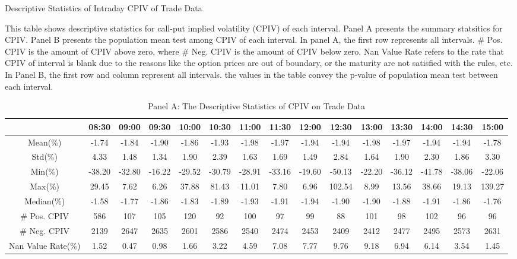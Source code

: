 \begin{table}[h]

\caption{Descriptive Statistics of Intraday CPIV of Trade Data}\label{table:stats_of_CPIV_2}
\begin{threeparttable}

\medskip

{\scriptsize 
This table shows descriptive statistics for call-put implied volatility (CPIV) of each interval. Panel A presents the summary statsitics for CPIV. Panel B presents the population mean test among CPIV of each interval. In panel A, the first row represents all intervals.  \# Pos. CPIV is the amount of CPIV above zero, where \# Neg. CPIV is the amount of CPIV below zero. Nan Value Rate refers to the rate that CPIV of interval is blank due to the reasons like the option prices are out of boundary, or the maturity are not satisfied with the rules, etc. In Panel B, the first row and column represent all intervals. the values in the table convey the p-value of population mean test between each interval.
}
\medskip

\begin{subtable}[t]{\linewidth}

\caption{Panel A: The Descriptive Statistics of CPIV on Trade Data }
\tiny

\begin{tabular}{ccccccccccccccc}
\toprule

                   & 08:30  & 09:00  & 09:30  & 10:00  & 10:30  & 11:00  & 11:30  & 12:00  & 12:30  & 13:00  & 13:30  & 14:00  & 14:30  & 15:00  \\ \midrule	
Mean(\%)           & -1.74  & -1.84  & -1.90  & -1.86  & -1.93  & -1.98  & -1.97  & -1.94  & -1.94  & -1.98  & -1.97  & -1.94  & -1.94  & -1.78  \\
Std(\%)            & 4.33   & 1.48   & 1.34   & 1.90   & 2.39   & 1.63   & 1.69   & 1.49   & 2.84   & 1.64   & 1.90   & 2.30   & 1.86   & 3.30   \\
Min(\%)            & -38.20 & -32.80 & -16.22 & -29.52 & -30.79 & -28.91 & -33.16 & -19.60 & -50.13 & -22.20 & -36.12 & -41.78 & -38.06 & -22.06 \\
Max(\%)            & 29.45  & 7.62   & 6.26   & 37.88  & 81.43  & 11.01  & 7.80   & 6.96   & 102.54 & 8.99   & 13.56  & 38.66  & 19.13  & 139.27 \\
Median(\%)         & -1.58  & -1.77  & -1.86  & -1.83  & -1.89  & -1.93  & -1.91  & -1.94  & -1.90  & -1.90  & -1.88  & -1.91  & -1.86  & -1.76  \\
\# Pos. CPIV       & 586    & 107    & 105    & 120    & 92     & 100    & 97     & 99     & 88     & 101    & 98     & 102    & 96     & 96     \\
\# Neg. CPIV       & 2139   & 2647   & 2635   & 2601   & 2586   & 2540   & 2474   & 2453   & 2409   & 2412   & 2477   & 2495   & 2573   & 2631   \\
Nan Value Rate(\%) & 1.52   & 0.47   & 0.98   & 1.66   & 3.22   & 4.59   & 7.08   & 7.77   & 9.76   & 9.18   & 6.94   & 6.14   & 3.54   & 1.45 
\\
\bottomrule
\end{tabular}
\end{subtable}



\end{threeparttable}
\end{table}
